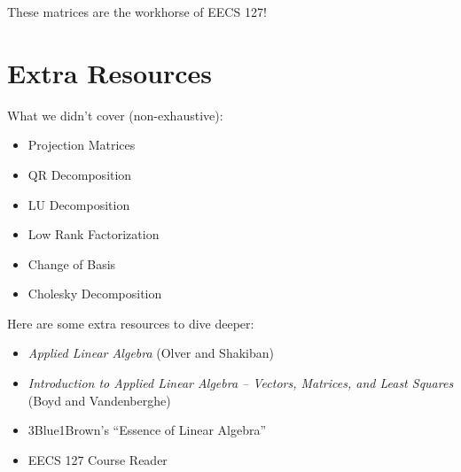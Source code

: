 \documentclass[11pt]{article}
\theoremstyle{definition}
\theoremstyle{plain}
\theoremstyle{remark}
\begin{document}
These matrices are the workhorse of EECS 127!

\newpage
\section{Extra Resources}

What we didn't cover (non-exhaustive):
\begin{itemize}[nosep]
  \item Projection Matrices
  \item QR Decomposition
  \item LU Decomposition
  \item Low Rank Factorization
  \item Change of Basis
  \item Cholesky Decomposition
\end{itemize}

\medskip
Here are some extra resources to dive deeper:
\begin{itemize}[nosep]
  \item \textit{Applied Linear Algebra} (Olver and Shakiban)
  \item \textit{Introduction to Applied Linear Algebra -- Vectors, Matrices, and Least Squares} (Boyd and Vandenberghe)
  \item 3Blue1Brown's ``Essence of Linear Algebra''
  \item EECS 127 Course Reader
\end{itemize}
\end{document}
